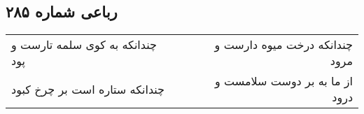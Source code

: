 \begin{center}
\section*{رباعی شماره ۲۸۵}
\label{sec:sh285}
\begin{longtable}{l p{0.5cm} r}
چندانکه به کوی سلمه تارست و پود
&&
چندانکه درخت میوه دارست و مرود
\\
چندانکه ستاره است بر چرخ کبود
&&
از ما به بر دوست سلامست و درود
\\
\end{longtable}
\end{center}
